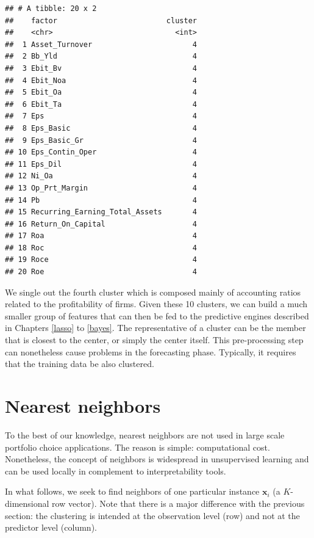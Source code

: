 \documentclass[]{krantz}
\theoremstyle{definition}
\theoremstyle{definition}
\theoremstyle{definition}
\theoremstyle{remark}
\begin{document}
\begin{verbatim}
## # A tibble: 20 x 2
##    factor                         cluster
##    <chr>                            <int>
##  1 Asset_Turnover                       4
##  2 Bb_Yld                               4
##  3 Ebit_Bv                              4
##  4 Ebit_Noa                             4
##  5 Ebit_Oa                              4
##  6 Ebit_Ta                              4
##  7 Eps                                  4
##  8 Eps_Basic                            4
##  9 Eps_Basic_Gr                         4
## 10 Eps_Contin_Oper                      4
## 11 Eps_Dil                              4
## 12 Ni_Oa                                4
## 13 Op_Prt_Margin                        4
## 14 Pb                                   4
## 15 Recurring_Earning_Total_Assets       4
## 16 Return_On_Capital                    4
## 17 Roa                                  4
## 18 Roc                                  4
## 19 Roce                                 4
## 20 Roe                                  4
\end{verbatim}

\normalsize

We single out the fourth cluster which is composed mainly of accounting
ratios related to the profitability of firms. Given these 10 clusters,
we can build a much smaller group of features that can then be fed to
the predictive engines described in Chapters \ref{lasso} to \ref{bayes}.
The representative of a cluster can be the member that is closest to the
center, or simply the center itself. This pre-processing step can
nonetheless cause problems in the forecasting phase. Typically, it
requires that the training data be also clustered.

\hypertarget{nearest-neighbors}{%
\section{Nearest neighbors}\label{nearest-neighbors}}

To the best of our knowledge, nearest neighbors are not used in large
scale portfolio choice applications. The reason is simple: computational
cost. Nonetheless, the concept of neighbors is widespread in
unsupervised learning and can be used locally in complement to
interpretability tools.

In what follows, we seek to find neighbors of one particular instance
\(\textbf{x}_i\) (a \(K\)-dimensional row vector). Note that there is a
major difference with the previous section: the clustering is intended
at the observation level (row) and not at the predictor level (column).
\end{document}
